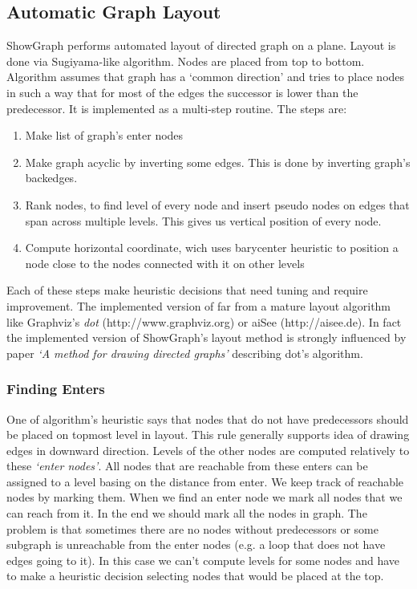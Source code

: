 \documentclass[11pt,a4paper]{article}
\begin{document}
\subsection{Automatic Graph Layout}
ShowGraph performs automated layout of directed graph on a plane. Layout is done via Sugiyama-like algorithm. Nodes are placed from top to bottom. Algorithm assumes that graph has a `common direction' and tries to place nodes in such a way that for most of the edges the successor is lower than the predecessor. It is implemented as a multi-step routine. The steps are:
\begin{enumerate}
\item Make list of graph's enter nodes
\item Make graph acyclic by inverting some edges. This is done by inverting graph's backedges.
\item Rank nodes, to find level of every node and insert pseudo nodes on edges that span across multiple levels. This gives us vertical position of every node.
\item Compute horizontal coordinate, wich uses barycenter heuristic to position a node close to the nodes connected with it on other levels
\end{enumerate}
Each of these steps make heuristic decisions that need tuning and require improvement. The implemented version of far from a mature layout algorithm like Graphviz's \emph{dot} (http://www.graphviz.org) or aiSee (http://aisee.de). In fact the implemented version of ShowGraph's layout method is strongly influenced by paper \emph{`A method for drawing directed graphs'} describing dot's algorithm.

\subsubsection{Finding Enters}
One of algorithm's heuristic says that nodes that do not have predecessors should be placed on topmost level in layout. This rule generally supports idea of drawing edges in downward direction. Levels of the other nodes are computed relatively to these \emph{`enter nodes'}. All nodes that are reachable from these enters can be assigned to a level basing on the distance from enter. We keep track of reachable nodes by marking them. When we find an enter node we mark all nodes that we can reach from it. In the end we should mark all the nodes in graph. The problem is that sometimes there are no nodes without predecessors or some subgraph is unreachable from the enter nodes (e.g. a loop that does not have edges going to it). In this case we can't compute levels for some nodes and have to make a heuristic decision selecting nodes that would be placed at the top.
\end{document}
